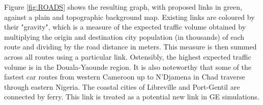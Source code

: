 \documentclass[a4paper]{article}
\begin{document}
Figure \ref{fig:ROADS} shows the resulting graph, with proposed links in green, against a plain and topographic background map. Existing links are coloured by their "gravity", which is a measure of the expected traffic volume obtained by multiplying the origin and destination city population (in thousands) of each route and dividing by the road distance in meters. This measure is then summed across all routes using a particular link. Ostensibly, the highest expected traffic volume is in the Douala-Yaounde region. It is also noteworthy that some of the fastest car routes from western Cameroon up to N'Djamena in Chad traverse through eastern Nigeria. The coastal cities of Libreville and Port-Gentil are connected by ferry. This link is treated as a potential new link in GE simulations.  %
\end{document}
